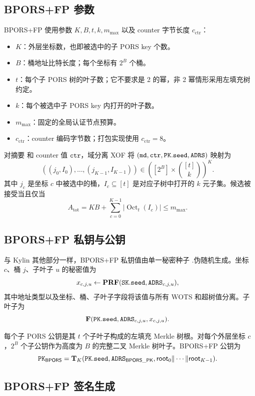 \subsection{BPORS+FP 参数}
\label{sec:bporspara}

BPORS+FP 使用参数 $K,B,t,k,m_{\max}$ 以及 counter 字节长度 $c_{\mathrm{ctr}}$：
\begin{itemize}
    \item $K$：外层坐标数，也即被选中的子 PORS key 个数。
    \item $B$：桶地址比特长度；每个坐标有 $2^B$ 个桶。
    \item $t$：每个子 PORS 树的叶子数；它不要求是 2 的幂，非 2 幂情形采用左填充树约定。
    \item $k$：每个被选中子 PORS key 内打开的叶子数。
    \item $m_{\max}$：固定的全局认证节点预算。
    \item $c_{\mathrm{ctr}}$：counter 编码字节数；打包实现使用 $c_{\mathrm{ctr}}=8$。
\end{itemize}

对摘要 \md 和 counter 值 $\mathtt{ctr}$，域分离 XOF 将 $(\md,\mathtt{ctr},\pk.\seed,\ADRS)$ 映射为
\[
    ((j_0,I_0),\ldots,(j_{K-1},I_{K-1}))
    \in \left([2^B]\times\binom{[t]}{k}\right)^K .
\]
其中 $j_c$ 是坐标 $c$ 中被选中的桶，$I_c\subseteq[t]$ 是对应子树中打开的 $k$ 元子集。候选被接受当且仅当
\[
    A_{\mathrm{tot}}
    =KB+\sum_{c=0}^{K-1}\left|\operatorname{Oct}_t(I_c)\right|
    \le m_{\max}.
\]

\subsection{BPORS+FP 私钥与公钥}

与 Kylin 其他部分一样，BPORS+FP 私钥值由单一秘密种子 \sk.\seed 伪随机生成。坐标 $c$、桶 $j$、子叶子 $u$ 的秘密值为
\[
    x_{c,j,u}\gets \PRF(\sk.\seed,\ADRS_{c,j,u}),
\]
其中地址类型以及坐标、桶、子叶子字段将该值与所有 WOTS 和超树值分离。子叶子为
\[
    \hashF(\pk.\seed,\ADRS_{c,j,u},x_{c,j,u}).
\]

每个子 PORS 公钥是其 $t$ 个子叶子构成的左填充 Merkle 树根。对每个外层坐标 $c$，$2^B$ 个子公钥作为高度为 $B$ 的完整二叉 Merkle 树叶子。BPORS+FP 公钥为
\[
    \pk_{\mathsf{BPORS}}
    =\Th_K(\pk.\seed,\ADRS_{\mathsf{BPORS\_PK}},
           \mathsf{root}_0\|\cdots\|\mathsf{root}_{K-1}).
\]

\subsection{BPORS+FP 签名生成}

